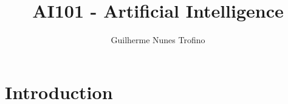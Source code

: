 \documentclass{article}
\title{AI101 - Artificial Intelligence}
\author{Guilherme Nunes Trofino}
\begin{document}
\maketitle

\newpage\tableofcontents

\section{Introduction}
\end{document}
